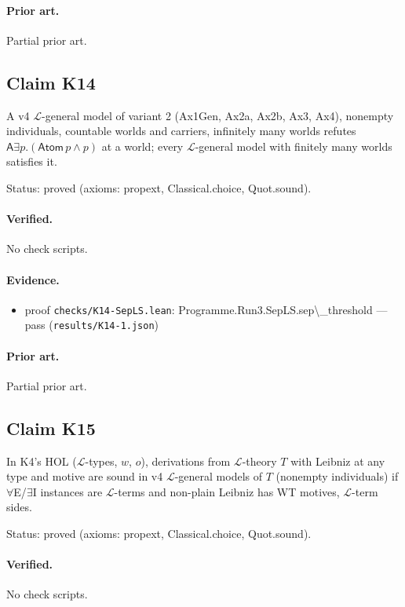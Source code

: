 \documentclass{article}
\begin{document}
\paragraph{Prior art.} Partial prior art.

\subsection*{Claim K14}

A v4 $\mathcal L$-general model of variant 2 (Ax1Gen, Ax2a, Ax2b, Ax3, Ax4), nonempty individuals, countable worlds and carriers, infinitely many worlds refutes $\mathsf A\exists p.(\mathsf{Atom}\,p\wedge p)$ at a world; every $\mathcal L$-general model with finitely many worlds satisfies it.

Status: proved (axioms: propext, Classical.choice, Quot.sound).

\paragraph{Verified.}
No check scripts.

\paragraph{Evidence.}
\begin{itemize}
\item proof \texttt{checks/K14-SepLS.lean}: Programme.Run3.SepLS.sep\textbackslash{}\_threshold --- pass (\texttt{results/K14-1.json})
\end{itemize}

\paragraph{Prior art.} Partial prior art.

\subsection*{Claim K15}

In K4's HOL ($\mathcal L$-types, $w$, $o$), derivations from $\mathcal L$-theory $T$ with Leibniz at any type and motive are sound in v4 $\mathcal L$-general models of $T$ (nonempty individuals) if $\forall$E/$\exists$I instances are $\mathcal L$-terms and non-plain Leibniz has WT motives, $\mathcal L$-term sides.

Status: proved (axioms: propext, Classical.choice, Quot.sound).

\paragraph{Verified.}
No check scripts.
\end{document}
